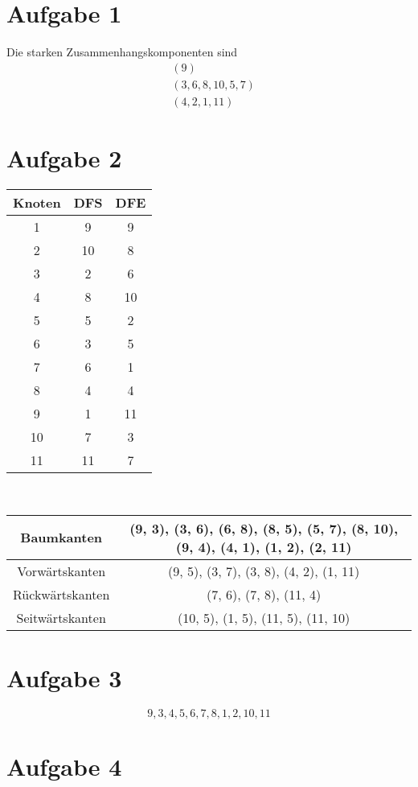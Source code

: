 \documentclass[10pt,a4paper]{article}
\begin{document}
\section{Aufgabe 1}
Die starken Zusammenhangskomponenten sind
\begin{align*}
  & (9)\\
  & (3, 6, 8, 10, 5, 7)\\
  & (4, 2, 1, 11)
\end{align*}

\section{Aufgabe 2}
\begin{tabular}{c|c|c}
Knoten & DFS & DFE\\
\hline
1 & 9 & 9\\
2 & 10 & 8\\
3 & 2 & 6\\
4 & 8 & 10\\
5 & 5 & 2\\
6 & 3 & 5\\
7 & 6 & 1\\
8 & 4 & 4\\
9 & 1 & 11\\
10 & 7 & 3\\
11 & 11 & 7
\end{tabular}
\\
\begin{tabular}{c|c}
  Baumkanten & (9, 3), (3, 6), (6, 8), (8, 5), (5, 7), (8, 10), (9, 4), (4, 1), (1, 2), (2, 11)\\\hline
  Vorwärtskanten & (9, 5), (3, 7), (3, 8), (4, 2), (1, 11)\\\hline
  Rückwärtskanten & (7, 6), (7, 8), (11, 4)\\\hline
  Seitwärtskanten & (10, 5), (1, 5), (11, 5), (11, 10)
\end{tabular}

\section{Aufgabe 3}
\begin{equation}
  9, 3, 4, 5, 6, 7, 8, 1, 2, 10, 11
\end{equation}

\section{Aufgabe 4}
\end{document}
